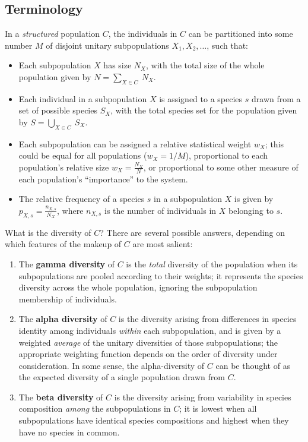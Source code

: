 \subsection{Terminology}
\label{sec:diversity-structured-terminology}

In a \textit{structured} population $C$, the individuals in $C$ can be partitioned into some number $M$ of disjoint unitary subpopulations $X_1, X_2, \dots$, such that:

\begin{itemize} %
\item Each subpopulation $X$ has size $N_X$, with the total size of the whole population given by $N = \sum_{X \in C}~N_X$.
\item Each individual in a subpopulation $X$ is assigned to a species $s$ drawn from a set of possible species $S_X$, with the total species set for the population given by $S = \bigcup_{X \in C}~S_X$.
\item Each subpopulation can be assigned a relative statistical weight $w_X$; this could be equal for all populations ($w_X = 1/M$), proportional to each population's relative size $w_X = \frac{N_X}{N}$, or proportional to some other measure of each population's ``importance'' to the system.
\item The relative frequency of a species $s$ in a subpopulation $X$ is given by $p_{X,s} = \frac{n_{X,s}}{N_X}$, where $n_{X,s}$ is the number of individuals in $X$ belonging to $s$.
\end{itemize}

\noindent What is the diversity of $C$? There are several possible answers, depending on which features of the makeup of $C$ are most salient:

\begin{enumerate}
\item The \textbf{gamma diversity} of $C$ is the \textit{total} diversity of the population when its subpopulations are pooled according to their weights; it represents the species diversity across the whole population, ignoring the subpopulation membership of individuals.
\item The \textbf{alpha diversity} of $C$ is the diversity arising from differences in species identity among individuals \textit{within} each subpopulation, and is given by a weighted \textit{average} of the unitary diversities of those subpopulations; the appropriate weighting function depends on the order of diversity under consideration. In some sense, the alpha-diversity of $C$ can be thought of as the expected diversity of a single population drawn from $C$.
\item The \textbf{beta diversity} of $C$ is the diversity arising from variability in species composition \textit{among} the subpopulations in $C$; it is lowest when all subpopulations have identical species compositions and highest when they have no species in common.
\end{enumerate}

